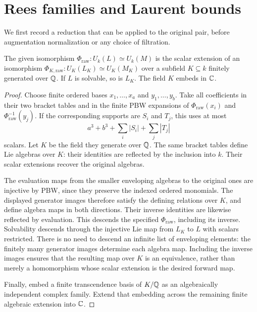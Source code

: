 \section{Rees families and Laurent bounds}\label{sec:rees}

We first record a reduction that can be applied to the original pair,
before augmentation normalization or any choice of filtration.

\begin{lemma}\label{lem:coefficient-field}
The given isomorphism $\Phi_{\mathrm{raw}}:U_k(L)\simeq U_k(M)$
is the scalar extension of an isomorphism
$\Phi_{K,\mathrm{raw}}:U_{K}(L_K)\simeq U_{K}(M_K)$ over a
subfield $K\subseteq k$ finitely generated over $\mathbb Q$. If $L$
is solvable, so is $L_K$. The field $K$ embeds in $\mathbb C$.
\end{lemma}

\begin{proof}
Choose finite ordered bases $x_1,\ldots,x_a$ and $y_1,\ldots,y_b$.
Take all coefficients in their two bracket tables and in the finite PBW
expansions of $\Phi_{\mathrm{raw}}(x_i)$ and $\Phi_{\mathrm{raw}}^{-1}(y_j)$. If the corresponding
supports are $S_i$ and $T_j$, this uses at most
\[
 a^3+b^3+\sum_i|S_i|+\sum_j|T_j|
\]
scalars. Let $K$ be the field they generate over $\mathbb Q$. The same
bracket tables define Lie algebras over $K$: their identities are
reflected by the inclusion into $k$. Their scalar extensions recover
the original algebras.

The evaluation maps from the smaller enveloping algebras to the original
ones are injective by PBW, since they preserve the indexed ordered
monomials. The displayed generator images therefore satisfy the defining
relations over $K$, and define algebra maps in both directions.
Their inverse identities are likewise reflected by evaluation. This
descends the specified $\Phi_{\mathrm{raw}}$, including its inverse. Solvability
descends through the injective Lie map from $L_K$ to
$L$ with scalars restricted.
There is no need to descend an infinite list of enveloping elements:
the finitely many generator images determine each algebra map.
Including the inverse images ensures that the resulting map over $K$
is an equivalence, rather than merely a homomorphism whose scalar
extension is the desired forward map.

Finally, embed a finite transcendence basis of $K/\mathbb Q$ as an
algebraically independent complex family. Extend that embedding across
the remaining finite algebraic extension into $\mathbb C$.
\end{proof}

